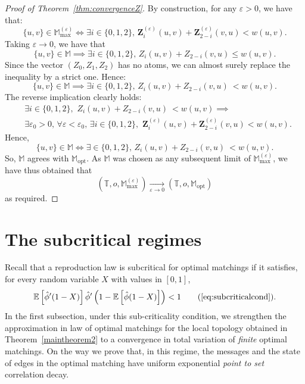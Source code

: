 \documentclass[11pt]{article}
\newcommand{\eps}{\varepsilon}
\begin{document}
\begin{proof}[Proof of Theorem~\ref{thm:convergenceZ}]
    By construction, for any $\eps >0$, we have that:
    \[ \{u,v\} \in \mathbb{M}_{\max}^{(\eps)}\iff \exists i \in \{0,1,2\}, \, \mathbf{Z}_i^{(\eps)}(u,v)+\mathbf{Z}_{2-i}^{(\eps)}(v,u) < w(u,v) .\]
    Taking $\eps \to 0$, we have that
    \[ \{u,v\} \in \mathbb{M}\implies  \exists i \in \{0,1,2\}, \, Z_i(u,v)+ Z_{2-i}(v,u)\leq w(u,v).   \]
    Since the vector $(Z_0,Z_1,Z_2)$ has no atoms, we can almost surely replace the inequality by a strict one.
    Hence:
    \[ \{u,v\} \in \mathbb{M} \implies  \exists i \in \{0,1,2\}, \, Z_i(u,v)+ Z_{2-i}(v,u)\ < w(u,v).   \]
    The reverse implication clearly holds:
    \begin{align*}
     &\exists i \in \{0,1,2\},\,\,  Z_i(u,v)+ Z_{2-i}(v,u)\ < w(u,v)  \implies \\
     &\exists \eps_0>0, \, \forall \eps < \eps_0,  \, \exists i \in \{0,1,2\}, \,\, \mathbf{Z}_i^{(\eps)}(u,v)+\mathbf{Z}_{2-i}^{(\eps)}(v,u) < w(u,v).  \end{align*}
     Hence,
    \[  \{u,v\} \in \mathbb{M} \iff  \exists  \in \{0,1,2\}, \, Z_i(u,v)+ Z_{2-i}(v,u)\ < w(u,v). \]
    So, $\mathbb{M}$ agrees with $\mathbb{M}_{\mathrm{opt}}$. As $\mathbb{M}$ was chosen as any subsequent limit of $\mathbb{M}_{\max}^{(\eps)}$, we have thus obtained that
    \[ \left( \mathbb{T},o,\mathbb{M}_{\max}^{(\eps)}\right) \underset{\eps \to 0}{\longrightarrow} \left( \mathbb{T},o,\mathbb{M}_{\mathrm{opt}} \right)   \]
    as required.
\end{proof}

\section{The subcritical regimes}
\label{sec:subcritical}

Recall that a reproduction law  is subcritical for optimal matchings if it satisfies, for every random variable $X$ with values in $[0,1]$,
\begin{equation}
      \mathbb{E}\left[ \hat{\phi}'(1-X)\right] \hat{\phi}'\left(1-\mathbb{E}\left[\hat{\phi}(1-X)\right]\right) < 1    \tag{\ref{eq:subcriticalcond}}.
\end{equation}
In the first subsection, under this sub-criticality condition, we strengthen the approximation in law of optimal matchings for the local topology obtained in Theorem~\ref{maintheorem2} to a convergence in total variation of {\it finite} optimal matchings. On the way we prove that, in this regime, the messages and the state of edges in the optimal matching have uniform exponential \emph{point to set} correlation decay.
\end{document}
